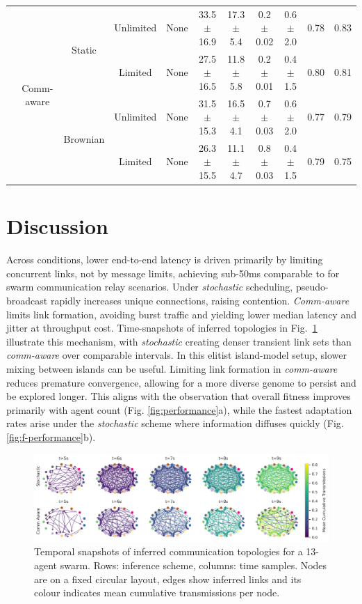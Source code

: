 \documentclass[conference]{IEEEtran}
\begin{document}
\begin{table}[ht]
\begin{tabular}{c|c|c|c|c|c|c|c|c|c|c}
  \cmidrule{2-11}
  & \multirow{5}{*}{Comm-aware}
    & \multirow{2}{*}{Static}
                 & Unlimited & None      & 33.5$\pm$16.9 & 17.3$\pm$5.4 & 0.2$\pm$0.02 & 0.6$\pm$2.0 & 0.78 & 0.83 \\
  &   &          & Limited   & None      & 27.5$\pm$16.5 & 11.8$\pm$5.8 & 0.2$\pm$0.01 & 0.4$\pm$1.5 & 0.80 & 0.81 \\
  \cmidrule{3-11}
  &   & \multirow{2}{*}{Brownian}
                 & Unlimited & None      & 31.5$\pm$15.3 & 16.5$\pm$4.1 & 0.7$\pm$0.03 & 0.6$\pm$2.0 & 0.77 & 0.79 \\
  &   &          & Limited   & None      & 26.3$\pm$15.5 & 11.1$\pm$4.7 & 0.8$\pm$0.03 & 0.4$\pm$1.5 & 0.79 & 0.75 \\
\bottomrule
\end{tabular}
\end{table}


\section{Discussion}\label{sec:discussion}
Across conditions, lower end-to-end latency is driven primarily by limiting concurrent links, not by message limits, achieving sub-50ms comparable to \cite{hauert_evolved_2009} for swarm communication relay scenarios. Under \emph{stochastic} scheduling, pseudo-broadcast rapidly increases unique connections, raising contention. \emph{Comm-aware} limits link formation, avoiding burst traffic and yielding lower median latency and jitter at throughput cost. Time-snapshots of inferred topologies in Fig.~\ref{fig:convergence} illustrate this mechanism, with \emph{stochastic} creating denser transient link sets than \emph{comm-aware} over comparable intervals. In this elitist island-model setup, slower mixing between islands can be useful. Limiting link formation in \emph{comm-aware} reduces premature convergence, allowing for a more diverse genome to persist and be explored longer. This aligns with the observation that overall fitness improves primarily with agent count (Fig. \ref{fig:performance}a), while the fastest adaptation rates arise under the \emph{stochastic} scheme where information diffuses quickly (Fig. \ref{fig:f-performance}b). \\

\begin{figure}[h]
    \centering
    \includegraphics[width=1\textwidth]{convergence_impact.pdf}
    \caption{Temporal snapshots of inferred communication topologies for a 13-agent swarm. Rows: inference scheme, columns: time samples. Nodes are on a fixed circular layout, edges show inferred links and its colour indicates mean cumulative transmissions per node.}
    \label{fig:convergence}
\end{figure}
\end{document}
